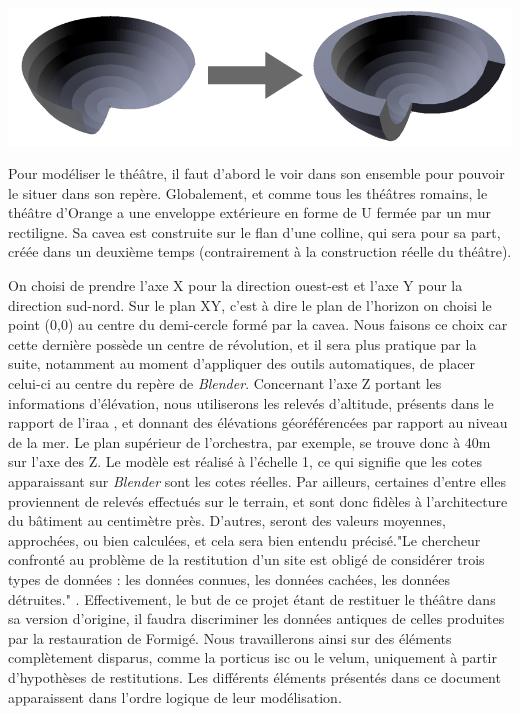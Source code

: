 \begin{figureth}
\begin{subfigureth}{0.45\textwidth}
		\caption{\gls{screw}}
	\end{subfigureth}
	\qquad
	\begin{subfigureth}{0.45\textwidth}
		\includegraphics[width=\linewidth]{images/solidify}
		\caption{\gls{solidify}}
	\end{subfigureth}
\caption{Illustration de quatre exemples de \glspl{modifier} \textit{Blender}}	
\label{exempleModifier}
\end{figureth}		

Pour modéliser le théâtre, il faut d'abord le voir dans son ensemble pour pouvoir le situer dans son repère. Globalement, et comme tous les théâtres romains, le théâtre d'Orange a une enveloppe extérieure en forme de U fermée par un mur rectiligne. Sa \gls{cavea} est construite sur le flan d'une colline, qui sera pour sa part, créée dans un deuxième temps (contrairement à la construction réelle du théâtre). 

On choisi de prendre l'axe X pour la direction ouest-est et l'axe Y pour la direction sud-nord. Sur le plan XY, c'est à dire le plan de l'horizon on choisi le point (0,0) au centre du demi-cercle formé par la \gls{cavea}. Nous faisons ce choix car cette dernière possède un centre de révolution, et il sera plus pratique par la suite, notamment au moment d'appliquer des outils automatiques, de placer celui-ci au centre du repère de \textit{Blender}. Concernant l'axe Z portant les informations d'élévation, nous utiliserons les relevés d'altitude, présents dans le rapport de l'\gls{iraa} \cite[Pl. XXIX, XLIV, XLVIII, XLIX, LX]{orangePl}, et donnant des élévations géoréférencées par rapport au niveau de la mer. Le plan supérieur de l'\gls{orchestra}, par exemple, se trouve donc à 40m sur l'axe des Z. Le modèle est réalisé à l'échelle 1, ce qui signifie que les cotes apparaissant sur \textit{Blender} sont les cotes réelles. Par ailleurs, certaines d'entre elles proviennent de relevés effectués sur le terrain, et sont donc fidèles à l'architecture du bâtiment au centimètre près. D'autres, seront des valeurs moyennes, approchées, ou bien calculées, et cela sera bien entendu précisé."Le chercheur confronté au problème de la restitution d’un site est obligé de considérer trois types de données : les données connues, les données cachées, les données détruites." \cite[p. 27]{golvin}. Effectivement, le but de ce projet étant de restituer le théâtre dans sa version d'origine, il faudra discriminer les données antiques de celles produites par la restauration de Formigé. Nous travaillerons ainsi sur des éléments complètement disparus, comme la \gls{porticus isc} ou le \gls{velum}, uniquement à partir d'hypothèses de restitutions. Les différents éléments présentés dans ce document apparaissent dans l'ordre logique de leur modélisation.


